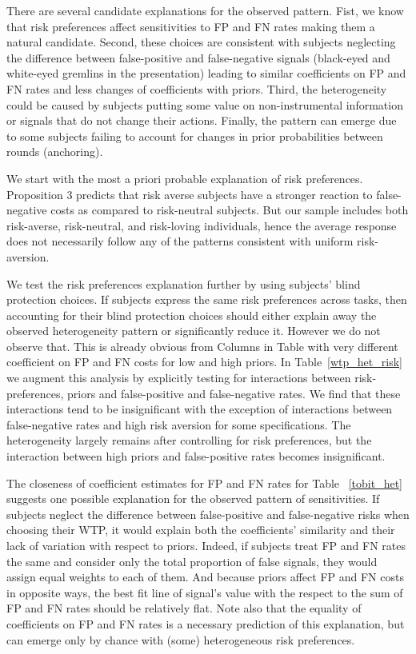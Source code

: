 \documentclass[12pt,a4paper]{article}
\begin{document}
There are several candidate explanations for the observed pattern. Fist, we know that risk preferences affect sensitivities to FP and FN rates making them a natural candidate. Second, these choices are consistent with subjects neglecting the difference between false-positive and false-negative signals (black-eyed and white-eyed gremlins in the presentation) leading to similar coefficients on FP and FN rates and less changes of coefficients with priors. Third, the heterogeneity could be caused by subjects putting some value on non-instrumental information or signals that do not change their actions. Finally, the pattern can emerge due to some subjects failing to account for changes in prior probabilities between rounds (anchoring). 

We start with the most a priori probable explanation of risk preferences. Proposition 3 predicts that risk averse subjects have a stronger reaction to false-negative costs as compared to risk-neutral subjects. But our sample includes both risk-averse, risk-neutral, and risk-loving individuals, hence the average response does not necessarily follow any of the patterns consistent with uniform risk-aversion. 

We test the risk preferences explanation further by using subjects' blind protection choices. If subjects express the same risk preferences across tasks, then accounting for their blind protection choices should either explain away the observed heterogeneity pattern or significantly reduce it. However we do not observe that. This is already obvious from Columns in Table with very different coefficient on FP and FN costs for low and high priors. In Table~\ref{wtp_het_risk} we augment this analysis by explicitly testing for interactions between risk-preferences, priors and false-positive and false-negative rates. We find that these interactions tend to be insignificant with the exception of interactions between false-negative rates and high risk aversion for some specifications. The heterogeneity largely remains after controlling for risk preferences, but the interaction between high priors and false-positive rates becomes insignificant.

The closeness of coefficient estimates for FP and FN rates for Table ~\ref{tobit_het} suggests one possible explanation for the observed pattern of sensitivities. If subjects neglect the difference between false-positive and false-negative risks when choosing their WTP, it would explain both the coefficients' similarity and their lack of variation with respect to priors. Indeed, if subjects treat FP and FN rates the same and consider only the total proportion of false signals, they would assign equal weights to each of them. And because priors affect FP and FN costs in opposite ways, the best fit line of signal's value with the respect to the sum of FP and FN rates should be relatively flat. Note also that the equality of coefficients on FP and FN rates is a necessary prediction of this explanation, but can emerge only by chance with (some) heterogeneous risk preferences.
\end{document}
